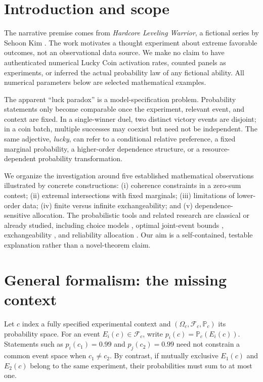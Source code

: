 \documentclass[11pt,a4paper]{article}
\newcommand{\PP}{\mathbb{P}}
\begin{document}
\section{Introduction and scope}

The narrative premise comes from \emph{Hardcore Leveling Warrior}, a fictional series by Sehoon Kim \cite{webtoon}. The work motivates a thought experiment about extreme favorable outcomes, not an observational data source. We make no claim to have authenticated numerical Lucky Coin activation rates, counted panels as experiments, or inferred the actual probability law of any fictional ability. All numerical parameters below are selected mathematical examples.

The apparent ``luck paradox'' is a model-specification problem. Probability statements only become comparable once the experiment, relevant event, and context are fixed. In a single-winner duel, two distinct victory events are disjoint; in a coin batch, multiple successes may coexist but need not be independent. The same adjective, \emph{lucky}, can refer to a conditional relative preference, a fixed marginal probability, a higher-order dependence structure, or a resource-dependent probability transformation.

We organize the investigation around five established mathematical observations illustrated by concrete constructions: (i) coherence constraints in a zero-sum contest; (ii) extremal intersections with fixed marginals; (iii) limitations of lower-order data; (iv) finite versus infinite exchangeability; and (v) dependence-sensitive allocation. The probabilistic tools and related research are classical or already studied, including choice models \cite{bradley,luce}, optimal joint-event bounds \cite{hoppe}, exchangeability \cite{kirsch,konstantopoulos}, and reliability allocation \cite{shaked}. Our aim is a self-contained, testable explanation rather than a novel-theorem claim.

\section{General formalism: the missing context}

Let $c$ index a fully specified experimental context and $(\Omega_c,\mathcal F_c,\PP_c)$ its probability space. For an event $E_i(c)\in\mathcal F_c$, write $p_i(c)=\PP_c(E_i(c))$. Statements such as $p_i(c_1)=0.99$ and $p_j(c_2)=0.99$ need not constrain a common event space when $c_1\ne c_2$. By contrast, if mutually exclusive $E_1(c)$ and $E_2(c)$ belong to the same experiment, their probabilities must sum to at most one.
\end{document}
